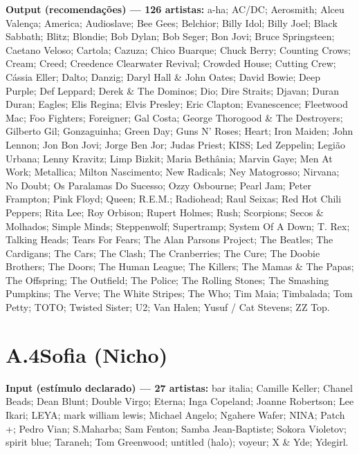 \begin{apendicesenv}
\noindent\textbf{Output (recomendações) --- 126 artistas:} a-ha; AC/DC; Aerosmith; Alceu Valença; America; Audioslave; Bee Gees; Belchior; Billy Idol; Billy Joel; Black Sabbath; Blitz; Blondie; Bob Dylan; Bob Seger; Bon Jovi; Bruce Springsteen; Caetano Veloso; Cartola; Cazuza; Chico Buarque; Chuck Berry; Counting Crows; Cream; Creed; Creedence Clearwater Revival; Crowded House; Cutting Crew; Cássia Eller; Dalto; Danzig; Daryl Hall \& John Oates; David Bowie; Deep Purple; Def Leppard; Derek \& The Dominos; Dio; Dire Straits; Djavan; Duran Duran; Eagles; Elis Regina; Elvis Presley; Eric Clapton; Evanescence; Fleetwood Mac; Foo Fighters; Foreigner; Gal Costa; George Thorogood \& The Destroyers; Gilberto Gil; Gonzaguinha; Green Day; Guns N' Roses; Heart; Iron Maiden; John Lennon; Jon Bon Jovi; Jorge Ben Jor; Judas Priest; KISS; Led Zeppelin; Legião Urbana; Lenny Kravitz; Limp Bizkit; Maria Bethânia; Marvin Gaye; Men At Work; Metallica; Milton Nascimento; New Radicals; Ney Matogrosso; Nirvana; No Doubt; Os Paralamas Do Sucesso; Ozzy Osbourne; Pearl Jam; Peter Frampton; Pink Floyd; Queen; R.E.M.; Radiohead; Raul Seixas; Red Hot Chili Peppers; Rita Lee; Roy Orbison; Rupert Holmes; Rush; Scorpions; Secos \& Molhados; Simple Minds; Steppenwolf; Supertramp; System Of A Down; T. Rex; Talking Heads; Tears For Fears; The Alan Parsons Project; The Beatles; The Cardigans; The Cars; The Clash; The Cranberries; The Cure; The Doobie Brothers; The Doors; The Human League; The Killers; The Mamas \& The Papas; The Offspring; The Outfield; The Police; The Rolling Stones; The Smashing Pumpkins; The Verve; The White Stripes; The Who; Tim Maia; Timbalada; Tom Petty; TOTO; Twisted Sister; U2; Van Halen; Yusuf / Cat Stevens; ZZ Top.

\section*{A.4\quad Sofia (Nicho)}

\noindent\textbf{Input (estímulo declarado) --- 27 artistas:} bar italia; Camille Keller; Chanel Beads; Dean Blunt; Double Virgo; Eterna; Inga Copeland; Joanne Robertson; Lee Ikari; LEYA; mark william lewis; Michael Angelo; Ngahere Wafer; NINA; Patch +; Pedro Vian; S.Maharba; Sam Fenton; Samba Jean-Baptiste; Sokora Violetov; spirit blue; Taraneh; Tom Greenwood; untitled (halo); voyeur; X \& Yde; Ydegirl.



\end{apendicesenv}
